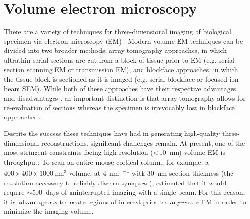 

\section{Volume electron microscopy}
\label{sec:1_vEM}

There are a variety of techniques for three-dimensional imaging of biological specimen via electron microscopy (EM) \cite{peddie2014exploring}. Modern volume EM techniques can be divided into two broader methods: array tomography approaches, in which ultrathin serial sections are cut from a block of tissue prior to EM (e.g. serial section scanning EM or transmission EM), and blockface approaches, in which the tissue block is sectioned as it is imaged (e.g. serial blockface or focused ion beam SEM). While both of these approaches have their respective advantages and disadvantages \cite{briggman2012volume, peddie2014exploring}, an important distinction is that array tomography allows for re-evaluation of sections whereas the specimen is irrevocably lost in blockface approaches \cite{schifferer2021niwaki}.

Despite the success these techniques have had in generating high-quality three-dimensional reconstructions, significant challenges remain. At present, one of the most stringent constraints facing high-resolution (<\,\SI{10}{\nano\meter}) volume EM is throughput. To scan an entire mouse cortical column, for example, a $400 \times 400 \times \SI{1000}{\micro\meter^3}$ volume, at \SI{4}{\nano\meter\per\pixel} with \SI{30}{\nano\meter} section thickness (the resolution necessary to reliably discern synapses \cite{harris1989dendritic, meinertzhagen1991synaptic}), \textcite{briggman2012volume} estimated that it would require ${\sim}$\SI{500}{days} of uninterrupted imaging with a single beam. For this reason, it is advantageous to locate regions of interest prior to large-scale EM in order to minimize the imaging volume.

